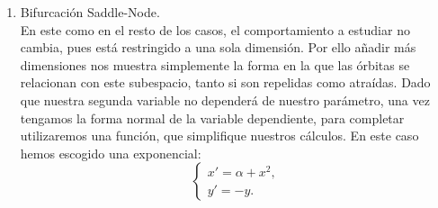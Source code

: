 \begin{enumerate}
	\item Bifurcación Saddle-Node. \\
	En este como en el resto de los casos, el comportamiento a estudiar no cambia, pues está restringido a una sola dimensión. Por ello añadir más dimensiones nos muestra simplemente la forma en la que las órbitas se relacionan con este subespacio, tanto si son repelidas como atraídas.
	Dado que nuestra segunda variable no dependerá de nuestro parámetro, una vez tengamos la forma normal de la variable dependiente, para completar utilizaremos una función, que simplifique nuestros cálculos. En este caso hemos escogido una exponencial:
	\begin{equation}
	\left \{ \begin{matrix}x'=\alpha+x^2, \\y'=-y.\end{matrix}\right.
	\label{fold2d}
	\end{equation}  
	

\end{enumerate}
